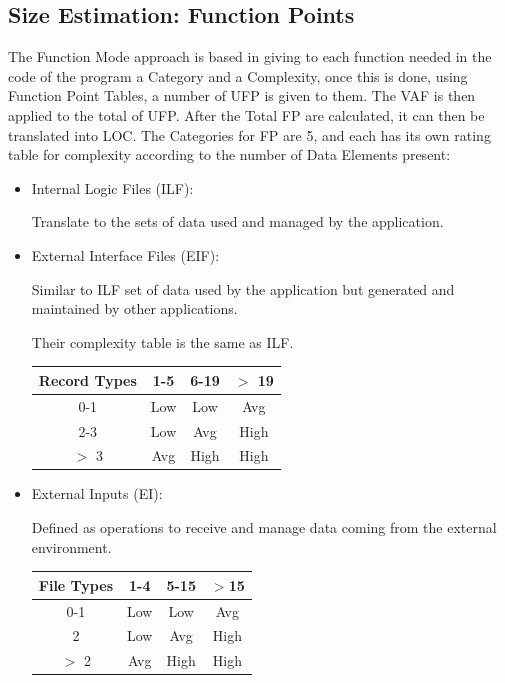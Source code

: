 \documentclass[a4paper]{article}
\begin{document}
\subsection{Size Estimation: Function Points}
The Function Mode approach is based in giving to each function needed in the code of the program a Category and a Complexity, once this is done, using Function Point Tables, a number of UFP is given to them. The VAF is then applied to the total of UFP. After the Total FP are calculated, it can then be translated into LOC.
The Categories for FP are 5, and each has its own rating table for complexity according to the number of Data Elements present:
\begin{itemize}
\item Internal Logic Files (ILF): \par
Translate to the sets of data used and managed by the application. 
\item External Interface Files (EIF): \par
Similar to ILF set of data used by the application but generated and maintained by other applications.\par
Their complexity table is the same as ILF.
\begin{center}
\begin{tabular}{ | c | c | c | c | }
\hline
	\textbf{Record Types} & \textbf{1-5} & \textbf{6-19} & \textbf{\(>\) 19}  \\ \hline\hline
	0-1 & Low & Low & Avg  \\ \hline
	2-3 & Low & Avg & High  \\ \hline
	\(>\) 3 & Avg & High & High  \\ \hline
\end{tabular}
\end{center}
\item External Inputs (EI): \par
Defined as operations to receive and manage data coming from the external environment.
\begin{center}
\begin{tabular}{ | c | c | c | c | }
\hline
	\textbf{File Types} & \textbf{1-4} & \textbf{5-15} & \textbf{\(>\)15} \\ \hline\hline
	0-1 & Low & Low & Avg  \\ \hline
	2 & Low & Avg & High  \\ \hline
	\(>\) 2 & Avg & High & High  \\ \hline
\end{tabular}
\end{center}

\end{itemize}
\end{document}
